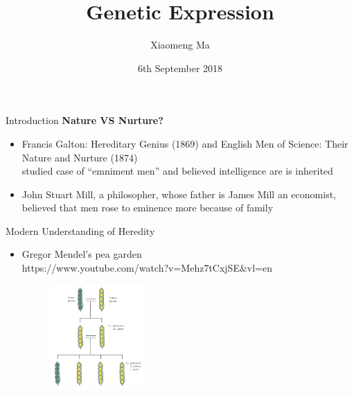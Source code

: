 \documentclass{beamer} %
\title[PSY 242 Developmental Psychology]{Genetic Expression}
\institute[College of Staten Island]{College of Staten Island, CUNY}
\author{Xiaomeng Ma}
\date{6th September 2018}
\begin{document}
 
\begin{frame}
	\titlepage
\end{frame}
\begin{frame}{Introduction}
\textbf{Nature VS Nurture?}
\pause
\begin{itemize}
    \item Francis Galton: Hereditary Genius (1869) and English Men of Science: Their Nature and Nurture (1874) 
    \\ studied case of “emniment men” and believed intelligence are is inherited
    \item John Stuart Mill, a philosopher, whose father is James Mill an economist, believed that men rose to eminence more because of family 
\end{itemize}
\end{frame}
\begin{frame}{Modern Understanding of Heredity}
\begin{itemize}
    \item Gregor Mendel's pea garden
    \\ https://www.youtube.com/watch?v=Mehz7tCxjSE&vl=en
    \begin{figure}
        \includegraphics[width=\linewidth, height = 4cm]{MendelPeas.jpg}
    \end{figure}
\end{itemize}
\end{frame}
\end{document}
